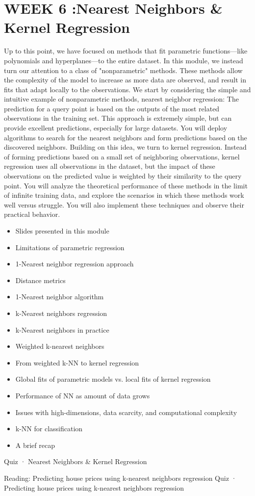 \section{WEEK 6 :Nearest Neighbors & Kernel Regression}
Up to this point, we have focused on methods that fit parametric functions---like polynomials and hyperplanes---to the entire dataset. In this module, we instead turn our attention to a class of "nonparametric" methods. These methods allow the complexity of the model to increase as more data are observed, and result in fits that adapt locally to the observations.
We start by considering the simple and intuitive example of nonparametric methods, nearest neighbor regression: The prediction for a query point is based on the outputs of the most related observations in the training set. This approach is extremely simple, but can provide excellent predictions, especially for large datasets. You will deploy algorithms to search for the nearest neighbors and form predictions based on the discovered neighbors. Building on this idea, we turn to kernel regression. Instead of forming predictions based on a small set of neighboring observations, kernel regression uses all observations in the dataset, but the impact of these observations on the predicted value is weighted by their similarity to the query point. You will analyze the theoretical performance of these methods in the limit of infinite training data, and explore the scenarios in which these methods work well versus struggle. You will also implement these techniques and observe their practical behavior.
\begin{itemize}
\item Slides presented in this module
\item Limitations of parametric regression
\item 1-Nearest neighbor regression approach
\item Distance metrics
\item 1-Nearest neighbor algorithm
\item k-Nearest neighbors regression
\item k-Nearest neighbors in practice
\item Weighted k-nearest neighbors
\item From weighted k-NN to kernel regression
\item Global fits of parametric models vs. local fits of kernel regression
\item Performance of NN as amount of data grows
\item Issues with high-dimensions, data scarcity, and computational complexity
\item k-NN for classification
\item A brief recap
\end{itemize}
Quiz · Nearest Neighbors & Kernel Regression
\item Reading: Predicting house prices using k-nearest neighbors regression
Quiz · Predicting house prices using k-nearest neighbors regression

